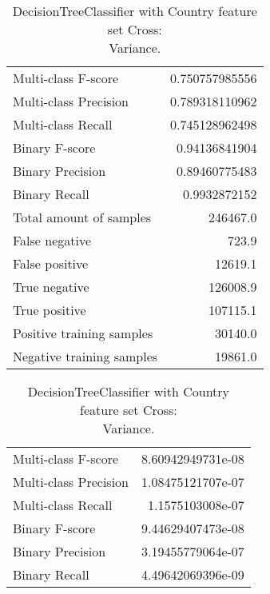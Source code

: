 \begin{table}[H]
\begin{minipage}{0.5\textwidth}
\caption{DecisionTreeClassifier with Country feature set Cross: \\Average.}
\centering
\begin{tabular}{l r}
\toprule
Multi-class F-score & 0.750757985556 \\
Multi-class Precision & 0.789318110962 \\
Multi-class Recall & 0.745128962498 \\
\midrule
Binary F-score & 0.94136841904 \\
Binary Precision & 0.89460775483 \\
Binary Recall & 0.9932872152 \\
\midrule
Total amount of samples & 246467.0 \\
False negative & 723.9 \\
False positive & 12619.1 \\
True negative & 126008.9 \\
True positive & 107115.1 \\
\midrule
Positive training samples & 30140.0 \\
Negative training samples & 19861.0 \\
\bottomrule
\end{tabular}
\end{minipage}
\hfillx
\begin{minipage}{0.5\textwidth}

\caption{DecisionTreeClassifier with Country feature set Cross: \\Variance.}
\centering
\begin{tabular}{l r}
\toprule
Multi-class F-score & 8.60942949731e-08 \\
Multi-class Precision & 1.08475121707e-07 \\
Multi-class Recall & 1.1575103008e-07 \\
\midrule
Binary F-score & 9.44629407473e-08 \\
Binary Precision & 3.19455779064e-07 \\
Binary Recall & 4.49642069396e-09 \\
\bottomrule
\end{tabular}
\end{minipage}
\end{table}
